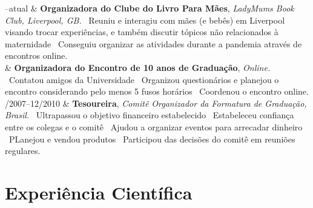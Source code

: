 \documentclass[11pt, a4paper]{article}
\newcommand{\Duration}[2]{\fontsize{10pt}{0}\selectfont #1--#2}
\newcommand{\Year}[1]{\fontsize{10pt}{0}\selectfont #1}
\begin{document}
\begin{EntriesTable}
	\Duration{2020}{atual}  &
	\textbf{Organizadora do Clube do Livro Para Mães},
	\newline
	\textit{ LadyMums Book Club, Liverpool, GB.}
	\newline
	\textbullet \ Reuniu e interagiu com mães (e bebês) em Liverpool visando
	trocar experiências, e também discutir tópicos não relacionados à maternidade
	\textbullet \ Conseguiu organizar as atividades durante a pandemia 
	através de encontros online.
	\\
	\Year{2020}  &
	\textbf{Organizadora do Encontro de 10 anos de Graduação},
	\newline
	\textit{ Online.}
	\newline
	\textbullet \ Contatou amigos da Universidade
	\textbullet \ Organizou questionários e planejou o encontro
	considerando pelo menos 5 fusos horários
	\textbullet \ Coordenou o encontro online.
	\\
	\Duration{04/2007}{12/2010}  &
	\textbf{Tesoureira},
	\newline
	\textit{ Comitê Organizador da Formatura de Graduação, Brasil.}
	\newline
	\textbullet \ Ultrapassou o objetivo financeiro estabelecido
	\textbullet \ Estabeleceu confiança entre os colegas e o comitê
	\textbullet \ Ajudou a organizar eventos para arrecadar dinheiro
	\textbullet \ PLanejou e vendou produtos
	\textbullet \ Participou das decisões do comitê em reuniões regulares.

\end{EntriesTable}

\section*{Experiência Científica}
\end{document}
